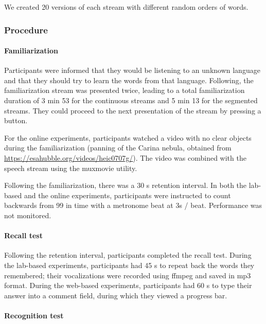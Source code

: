 \documentclass[]{article}
\let\oldparagraph\paragraph
\renewcommand{\paragraph}[1]{\oldparagraph{#1}\mbox{}}
\begin{document}
We created 20 versions of each stream with different random orders of words.

\clearpage

\subsubsection{Procedure}\label{procedure-1}

\paragraph{Familiarization}\label{familiarization}

Participants were informed that they would be listening to an unknown language and that they should try to learn the words from that language. Following, the familiarization stream was presented twice, leading to a total familiarization duration of 3 min 53 for the continuous streams and 5 min 13 for the segmented streams. They could proceed to the next presentation of the stream by pressing a button.

For the online experiments, participants watched a video with no clear objects during the familiarization (panning of the Carina nebula, obtained from \url{https://esahubble.org/videos/heic0707g/}). The video was combined with the speech stream using the muxmovie utility.

Following the familiarization, there was a 30 s retention interval. In both the lab-based and the online experiments, participants were instructed to count backwards from 99 in time with a metronome beat at 3s / beat. Performance was not monitored.

\paragraph{Recall test}\label{recall-test}

Following the retention interval, participants completed the recall test. During the lab-based experiments, participants had 45 s to repeat back the words they remembered; their vocalizations were recorded using ffmpeg and saved in mp3 format. During the web-based experiments, participants had 60 s to type their answer into a comment field, during which they viewed a progress bar.

\paragraph{Recognition test}\label{recognition-test}
\end{document}
